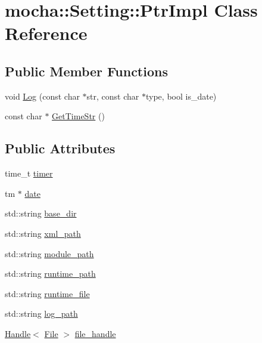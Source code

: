 \hypertarget{classmocha_1_1_setting_1_1_ptr_impl}{
\section{mocha::Setting::PtrImpl Class Reference}
\label{classmocha_1_1_setting_1_1_ptr_impl}
}
\subsection*{Public Member Functions}
\begin{DoxyCompactItemize}
\item 
void \hyperlink{classmocha_1_1_setting_1_1_ptr_impl_a9da7dfb33eca8d626e3e83ed7f16ea4f}{Log} (const char $\ast$str, const char $\ast$type, bool is\_\-date)
\item 
const char $\ast$ \hyperlink{classmocha_1_1_setting_1_1_ptr_impl_a4f192235cec633aef48cc272a8817536}{GetTimeStr} ()
\end{DoxyCompactItemize}
\subsection*{Public Attributes}
\begin{DoxyCompactItemize}
\item 
time\_\-t \hyperlink{classmocha_1_1_setting_1_1_ptr_impl_a28bf43280c03b9c9dd6b56ab088f8dbd}{timer}
\item 
tm $\ast$ \hyperlink{classmocha_1_1_setting_1_1_ptr_impl_a222a92c2db05a720480fba0058811897}{date}
\item 
std::string \hyperlink{classmocha_1_1_setting_1_1_ptr_impl_a5f948e7b0df7583a113ab5fa6c228afa}{base\_\-dir}
\item 
std::string \hyperlink{classmocha_1_1_setting_1_1_ptr_impl_a5fddd4f897b994fe6a0144aa9f57c806}{xml\_\-path}
\item 
std::string \hyperlink{classmocha_1_1_setting_1_1_ptr_impl_afdf93bd92b091ae41c99a3893f53556b}{module\_\-path}
\item 
std::string \hyperlink{classmocha_1_1_setting_1_1_ptr_impl_a10a54f3e368e263c56d7c804fffd110c}{runtime\_\-path}
\item 
std::string \hyperlink{classmocha_1_1_setting_1_1_ptr_impl_a103e94005df3c27317024aa749bdf484}{runtime\_\-file}
\item 
std::string \hyperlink{classmocha_1_1_setting_1_1_ptr_impl_a3c6deed4732e06e7e8e9e79e5a04b3ed}{log\_\-path}
\item 
\hyperlink{classmocha_1_1_handle}{Handle}$<$ \hyperlink{classmocha_1_1_file}{File} $>$ \hyperlink{classmocha_1_1_setting_1_1_ptr_impl_adaa2a9b5f450b5860a9eeae593a09d26}{file\_\-handle}
\end{DoxyCompactItemize}
